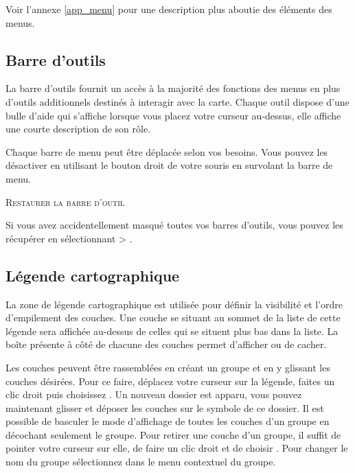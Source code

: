 Voir l'annexe \ref{app_menu} pour une description plus aboutie des éléments des menus.

\subsection{Barre d'outils}\label{label_toolbars}

La barre d'outils fournit un accès à la majorité des fonctions des menus en plus d'outils additionnels destinés à interagir avec la carte. Chaque outil dispose d'une bulle d'aide qui s'affiche lorsque vous placez votre curseur au-dessus, elle affiche une courte description de son rôle.

Chaque barre de menu peut être déplacée selon vos besoins. Vous pouvez les désactiver en utilisant le bouton droit de votre souris en survolant la barre de menu.

\begin{Astuce}
\caption{\textsc{Restaurer la barre d'outil}} 
Si vous avez accidentellement masqué toutes vos barres d'outils, vous pouvez les récupérer en sélectionnant  > .
\end{Astuce}

\subsection{Légende cartographique}\label{label_legend}

La zone de légende cartographique est utilisée pour définir la visibilité et l'ordre d'empilement des couches. Une couche se situant au sommet de la liste de cette légende sera affichée au-dessus de celles qui se situent plus bas dans la liste. La boîte présente à côté de chacune des couches permet d'afficher ou de cacher.

Les couches peuvent être rassemblées en créant un groupe et en y glissant les couches désirées. Pour ce faire, déplacez votre curseur sur la légende, faites un clic droit puis choisissez . Un nouveau dossier est apparu, vous pouvez maintenant glisser et déposer les couches sur le symbole de ce dossier. Il est possible de basculer le mode d'affichage de toutes les couches d'un groupe en décochant seulement le groupe. Pour retirer une couche d'un groupe, il suffit de pointer votre curseur sur elle, de faire un clic droit et de choisir . Pour changer le nom du groupe sélectionnez  dans le menu contextuel du groupe.

